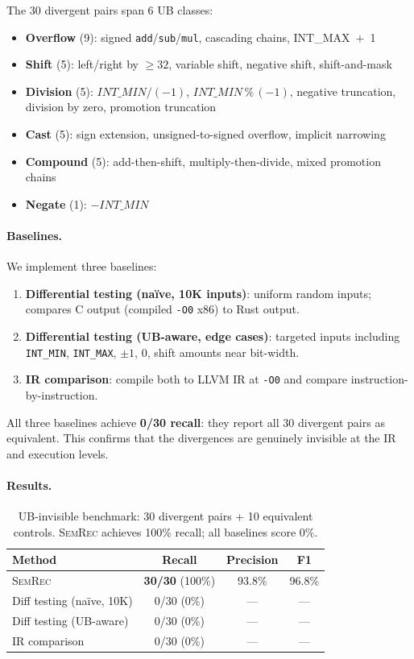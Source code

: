 \documentclass[10pt,a4paper]{article}
\begin{document}
The 30 divergent pairs span 6 UB classes:
\begin{itemize}[nosep]
  \item \textbf{Overflow} (9): signed \texttt{add}/\texttt{sub}/\texttt{mul},
    cascading chains, INT\_MAX~$+$~1
  \item \textbf{Shift} (5): left/right by ${\geq}32$, variable shift,
    negative shift, shift-and-mask
  \item \textbf{Division} (5): $\mathit{INT\_MIN}/(-1)$,
    $\mathit{INT\_MIN}\,\%\,(-1)$, negative truncation, division by zero,
    promotion truncation
  \item \textbf{Cast} (5): sign extension, unsigned-to-signed overflow,
    implicit narrowing
  \item \textbf{Compound} (5): add-then-shift, multiply-then-divide,
    mixed promotion chains
  \item \textbf{Negate} (1): $-\mathit{INT\_MIN}$
\end{itemize}

\paragraph{Baselines.}
We implement three baselines:
\begin{enumerate}[nosep]
  \item \textbf{Differential testing (na\"ive, 10K inputs)}: uniform
    random inputs; compares C output (compiled \texttt{-O0} x86) to
    Rust output.
  \item \textbf{Differential testing (UB-aware, edge cases)}: targeted
    inputs including \texttt{INT\_MIN}, \texttt{INT\_MAX}, $\pm1$, $0$,
    shift amounts near bit-width.
  \item \textbf{IR comparison}: compile both to LLVM IR at \texttt{-O0}
    and compare instruction-by-instruction.
\end{enumerate}
All three baselines achieve \textbf{0/30 recall}: they report all 30
divergent pairs as equivalent.  This confirms that the divergences are
genuinely invisible at the IR and execution levels.

\paragraph{Results.}

\begin{table}[t]
\centering
\small
\caption{UB-invisible benchmark: 30 divergent pairs + 10 equivalent
controls.  \textsc{SemRec} achieves 100\% recall; all baselines score
0\%.}
\label{tab:ub-invisible}
\begin{tabular}{@{}lccc@{}}
\toprule
Method & Recall & Precision & F1 \\
\midrule
\textsc{SemRec} & \textbf{30/30} (100\%) & 93.8\% & 96.8\% \\
Diff testing (na\"ive, 10K) & 0/30 (0\%) & --- & --- \\
Diff testing (UB-aware) & 0/30 (0\%) & --- & --- \\
IR comparison & 0/30 (0\%) & --- & --- \\
\bottomrule
\end{tabular}
\end{table}
\end{document}

